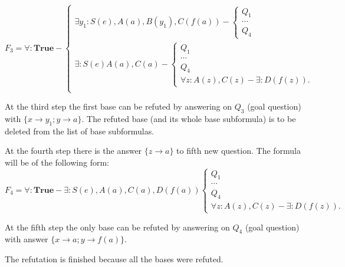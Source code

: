 \documentclass[runningheads,a4paper]{llncs}
\begin{document}
\begin{example}
\begin{equation*}\label{ex:f3}
F_3 =
\forall:\boldsymbol{True} -
\left\lbrace
\begin{array}{l}
  \exists y_1\colon S(e),A(a),B(y_1),C(f(a)) -
  \left\lbrace
  \begin{array}{l}
    Q_1 \\ \cdots \\ Q_4
  \end{array}\right. \\
  \exists\colon S(e)A(a),C(a) -
  \left\lbrace
  \begin{array}{l}
    Q_1 \\ \cdots \\ Q_4 \\
    \forall z\colon A(z),C(z) - \exists\colon D(f(z)).
  \end{array}\right. \\
\end{array}\right.
\end{equation*}

At the third step the first base can be refuted by answering on $Q_3$ (goal question) with $\{x \rightarrow y_1; y \rightarrow a\}$.  The refuted base (and its whole base subformula) is to be deleted from the list of base subformulas.

At the fourth step there is the answer $\{z \rightarrow a\}$ to fifth new question.  The formula will be of the following form:
\begin{equation*}\label{ex:f5}
  F_4 = \forall\colon\boldsymbol{True} - \exists\colon S(e),A(a), C(a),D(f(a))
  \left\lbrace
  \begin{array}{l}
    Q_1 \\ \cdots \\ Q_4 \\
    \forall z\colon A(z),C(z) - \exists\colon D(f(z)).
  \end{array}\right.
\end{equation*}

At the fifth step the only base can be refuted by answering on $Q_4$ (goal question) with  answer $\{x \rightarrow a; y \rightarrow f(a)\}$.

The refutation is finished because all the bases were refuted.

\end{example}


\end{document}
